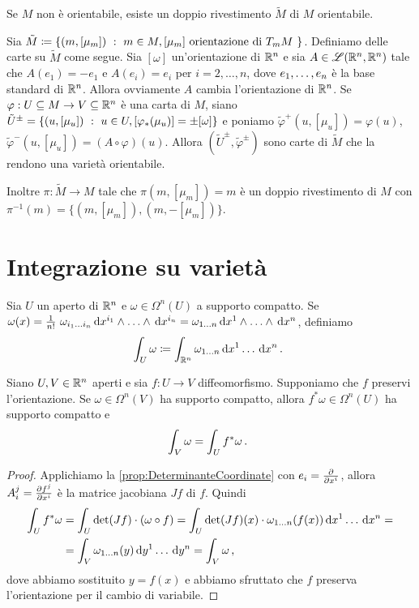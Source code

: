 \begin{remark}
	Se $M$ non è orientabile, esiste un doppio rivestimento $\tilde M$ di $M$ orientabile.
	
	Sia $\tilde M \coloneqq \{ (m,[\mu_m]) \suchthat m\in M, \text{$[\mu_m]$ orientazione di $T_mM$ } \}$. Definiamo delle carte su $\tilde M$ come segue. Sia $[\omega]$ un'orientazione di $\R^n$ e sia $A\in\Lin(\R^n,\R^n)$ tale che $A(e_1) = -e_1$ e $A(e_i) = e_i$ per $i=2,\ldots,n$, dove $\seqb en,$ è la base standard di $\R^n$. Allora ovviamente $A$ cambia l'orientazione di $\R^n$.
	Se $\varphi:U\subseteq M \to V\subseteq \R^n$ è una carta di $M$, siano $\tilde U^\pm = \{ (u,[\mu_u]) \suchthat u \in U, [\varphi_*(\mu_u)] = \pm[\omega] \}$ e poniamo $\tilde\varphi^+(u,[\mu_u]) = \varphi(u)$, $\tilde\varphi^-(u,[\mu_u]) = (A\circ\varphi)(u)$.
	Allora $(\tilde U^\pm,\tilde\varphi^\pm)$ sono carte di $\tilde M$ che la rendono una varietà orientabile.
	
	Inoltre $\pi:\tilde M\to M$ tale che $\pi(m, [\mu_m]) = m$ è un doppio rivestimento di $M$ con $\pi^{-1}(m) = \{ (m,[\mu_m] ), (m,-[\mu_m]) \}$.
\end{remark}


\section{Integrazione su varietà}

\begin{definition} %
	Sia $U$ un aperto di $\R^n$ e $\omega\in\Omega^n(U)$ a supporto compatto. Se $\omega(x) = \frac 1{n!}\ \omega_{\seqb in{}} \de x^{i_1}\wedge \ldots \wedge \de x^{i_n} = \omega_{1\ldots n} \seqa{\de x}n\wedge$, definiamo
	\begin{equation*}
		\int_U \omega \coloneqq \int_{\R^n} \omega_{1 \ldots n} \seqa {\de x}n{} \punto 
	\end{equation*}
\end{definition}

\begin{proposition} \label{prop:CambioVariabileRn}
	Siano $U,V\in\R^n$ aperti e sia $f:U\to V$ diffeomorfismo. Supponiamo che $f$ preservi l'orientazione. Se $\omega \in \Omega^n(V)$ ha supporto compatto, allora $f^*\omega \in \Omega^n(U)$ ha supporto compatto e 
	\begin{equation*}
		\int_V \omega = \int_U f^*\omega \punto
	\end{equation*}
\end{proposition}
\begin{proof}
	Applichiamo la \cref{prop:DeterminanteCoordinate} con $e_i= \DerParz{}{x^i}$, allora $A_i^j = \DerParz{f^j}{x^i}$ è la matrice jacobiana $Jf$ di $f$. Quindi
	\begin{align*}
		\int_U f^*\omega &= \int_U \det (Jf) \cdot (\omega\circ f) = \int_U \det (Jf)(x)\cdot \omega_{1\ldots n}(f(x)) \seqa {\de x}n{} =\\
		&= \int_V \omega_{1\ldots n}(y) \seqa {\de y}n{} = \int_V \omega \virgola
	\end{align*}
	dove abbiamo sostituito $y=f(x)$ e abbiamo sfruttato che $f$ preserva l'orientazione per il cambio di variabile.
\end{proof}

